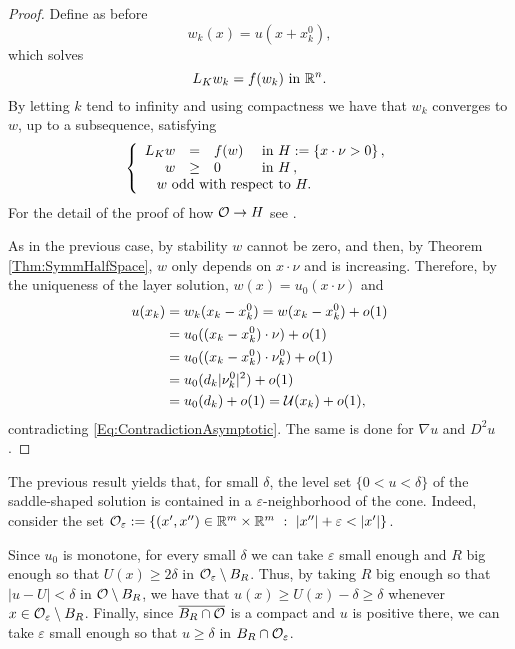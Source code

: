 \begin{proof}
Define as before
$$ w_k (x) = u(x+x_k^0), $$
which solves
$$ L_K  w_k = f(w_k) \ \text{in } \mathbb{R}^n. $$
By letting $k$ tend to infinity and using compactness  we have that $w_k$ converges to $w$, up to a subsequence, satisfying
$$
\beqc{\PDEsystem}
L_K  w &=& f(w)  &\textrm{ in } H:=\{x\cdot \nu >0\}\,,\\
w &\geq& 0  &\textrm{ in } H\,,\\
\,\,w \text{ odd with respect to } H. \span\span\span \,
\eeqc
$$
For the detail of the proof of how $\mathcal{O} \rightarrow H$ see \cite{CabreTerra1}.

As in the previous case, by stability $w$ cannot be zero, and then, by Theorem \ref{Thm:SymmHalfSpace}, $w$ only depends on $x\cdot \nu$ and is increasing. Therefore, by the uniqueness of the layer solution, $w(x) = u_0(x\cdot \nu)$ and
\begin{align*}
u(x_k) &= w_k(x_k-x_k^0) = w(x_k-x_k^0) + o(1) \\
&= u_0((x_k-x_k^0)\cdot \nu) + o(1) \\
&= u_0((x_k-x_k^0)\cdot \nu_k^0) + o(1) \\
&= u_0(d_k |\nu_k^0|^2) + o(1) \\
&= u_0(d_k) + o(1) = \mathcal{U} (x_k) + o(1),
\end{align*}
contradicting \eqref{Eq:ContradictionAsymptotic}. The same is done for $\nabla u$ and $D^2 u$.
\end{proof}

\begin{remark}
	\label{Remark:u>delta}
	The previous result yields that, for small $\delta$, the level set $\{0<u<\delta\}$ of the saddle-shaped solution is contained in a $\varepsilon$-neighborhood of the cone. Indeed, consider the set $\ocal_\varepsilon := \{(x',x'')\in \R^m\times\R^m \ : \ |x''|+\varepsilon <|x'| \}$. 
	
	Since $u_0$ is monotone, for every small $\delta$ we can take $\varepsilon$ small enough and $R$ big enough so that $U(x)\geq 2\delta$ in $\mathcal{O}_\varepsilon \setminus B_R$. Thus, by taking $R$ big enough so that $|u-U|< \delta$ in $\mathcal{O} \setminus B_R$, we have that $u(x) \geq U(x)-\delta \geq \delta$ whenever $x\in \mathcal{O}_\varepsilon \setminus B_R$. Finally, since $\overline{B_R \cap \mathcal{O}}$ is a compact and $u$ is positive there, we can take $\varepsilon$ small enough so that $u\geq \delta$ in $B_R\cap \mathcal{O}_\varepsilon$.
\end{remark}